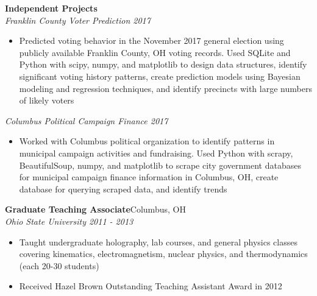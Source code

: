\documentclass[line]{letter}
\begin{document}
\begin{addmargin}[1em]{1em}
{\large {\bf Independent Projects}\vspace{1mm}}\\
\vspace{-2mm}
{\large \it Franklin County Voter Prediction \hfill 2017} \\
\vspace{-5mm}
\begin{itemize}[leftmargin=5mm]
\item Predicted voting behavior in the November 2017 general election using publicly available Franklin County, OH voting records. Used SQLite and Python with scipy, numpy, and matplotlib to design data structures, identify significant voting history patterns, create prediction models using Bayesian modeling and regression techniques, and identify precincts with large numbers of likely voters
\end{itemize}
\vspace{-1mm}
{\large \it Columbus Political Campaign Finance \hfill 2017} \\
\vspace{-7mm}
\begin{itemize}[leftmargin=5mm]
\item Worked with Columbus political organization to identify patterns in municipal campaign activities and fundraising. Used Python with scrapy, BeautifulSoup, numpy, and matplotlib to scrape city government databases for municipal campaign finance information in Columbus, OH, create database for querying scraped data, and identify trends
\end{itemize}


{\large {\bf Graduate Teaching Associate}\hfill Columbus, OH\vspace{1mm}}\\
{\large \it Ohio State University \hfill 2011 - 2013} \\
\vspace{-7mm}
\begin{itemize}[leftmargin=5mm]
\item Taught undergraduate holography, lab courses, and general physics classes covering kinematics, electromagnetism, nuclear physics, and thermodynamics (each 20-30 students)
\item Received Hazel Brown Outstanding Teaching Assistant Award in 2012
\end{itemize}

\end{addmargin}

\end{document}
